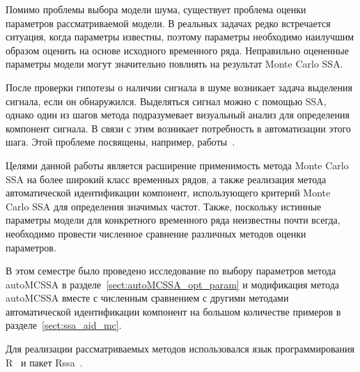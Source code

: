 \documentclass[specialist,
substylefile = spbu_report.rtx,
subf,12pt]{disser}
\theoremstyle{definition}
\begin{document}
Помимо проблемы выбора модели шума, существует проблема оценки параметров рассматриваемой модели. В реальных задачах редко встречается ситуация, когда параметры известны, поэтому параметры необходимо наилучшим образом оценить на основе исходного временного ряда. Неправильно оцененные параметры модели могут значительно повлиять на результат Monte Carlo SSA.

После проверки гипотезы о наличии сигнала в шуме возникает задача выделения сигнала, если он обнаружился. Выделяться сигнал можно с помощью SSA, однако один из шагов метода подразумевает визуальный анализ для определения компонент сигнала. В связи с этим возникает потребность в автоматизации этого шага. Этой проблеме посвящены, например, работы~\cite{Alexandrov2009, Kalantari2019, Bogalo2021, autoSSA}.

Целями данной работы является расширение применимость метода Monte Carlo SSA на более широкий класс временных рядов, а также реализация метода автоматической идентификации компонент, использующего критерий Monte Carlo SSA для определения значимых частот. Также, поскольку истинные параметры модели для конкретного временного ряда неизвестны почти всегда, необходимо провести численное сравнение различных методов оценки параметров.

В этом семестре было проведено исследование по выбору параметров метода \newline autoMCSSA в разделе~\ref{sect:autoMCSSA_opt_param} и модификация метода autoMCSSA вместе с численным сравнением с другими методами автоматической идентификации компонент на большом количестве примеров в разделе~\ref{sect:ssa_aid_mc}.

Для реализации рассматриваемых методов использовался язык программирования \textsf{R}~\cite{R} и пакет \textsf{Rssa}~\cite{SSA_R}.

\end{document}
